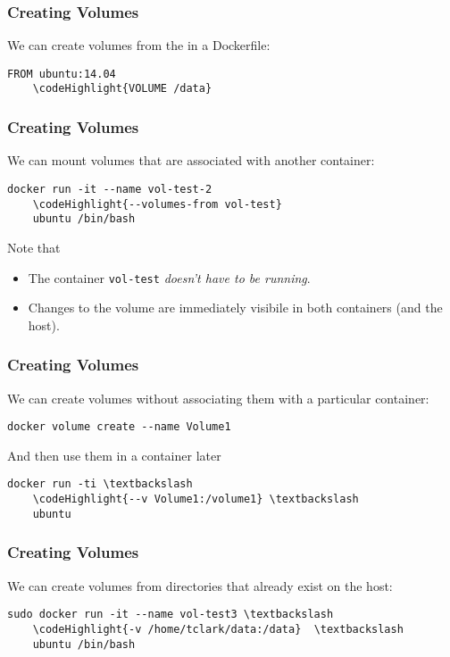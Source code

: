 \documentclass[10pt]{beamer}
\newcommand\codeHighlight[1]{\textcolor[rgb]{1,0,0}{\textbf{#1}}}
\begin{document}
\begin{frame}[fragile]
	\frametitle{Creating Volumes}
	We can create volumes from the in a Dockerfile:
	
	\begin{Verbatim}[commandchars=\\\{\}]
	FROM ubuntu:14.04
	\codeHighlight{VOLUME /data}
	\end{Verbatim}
\end{frame}

\begin{frame}[fragile]
	\frametitle{Creating Volumes}
	We can mount volumes that are associated with another container:
	
	\begin{Verbatim}[commandchars=\\\{\}]
	docker run -it --name vol-test-2 
	\codeHighlight{--volumes-from vol-test} 
	ubuntu /bin/bash
	\end{Verbatim}
	
	Note that 
	\begin{itemize}
		\item The container \texttt{vol-test} \emph{doesn't have to be running}.
		\item Changes to the volume are immediately visibile in both containers (and the host).
	\end{itemize}
\end{frame}

\begin{frame}[fragile]
	\frametitle{Creating Volumes}
	We can create volumes without associating them with a particular container:
	
	\begin{Verbatim}[commandchars=\\\{\}]
	docker volume create --name Volume1
	\end{Verbatim}
	
	And then use them in a container later
	\begin{Verbatim}[commandchars=\\\{\}]
	docker run -ti \textbackslash
	\codeHighlight{--v Volume1:/volume1} \textbackslash
	ubuntu
	\end{Verbatim}

\end{frame}

\begin{frame}[fragile]
	\frametitle{Creating Volumes}
	We can create volumes from directories that already exist on the host:
	
	\begin{Verbatim}[commandchars=\\\{\}]
	sudo docker run -it --name vol-test3 \textbackslash
	\codeHighlight{-v /home/tclark/data:/data}  \textbackslash
	ubuntu /bin/bash
	\end{Verbatim}
\end{frame}
\end{document}

